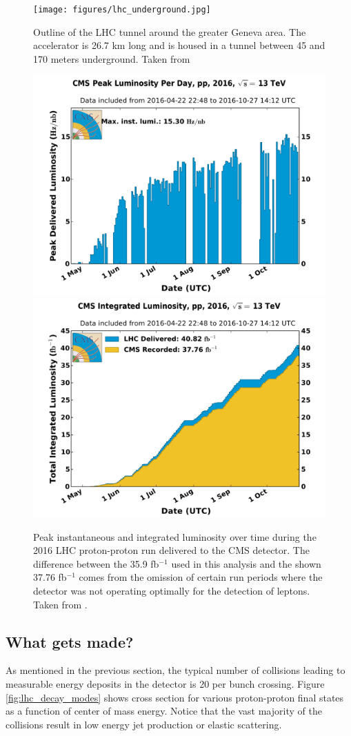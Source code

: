   \begin{figure}[h!]
    \centering
    \texttt{[image: figures/lhc\_underground.jpg]}
    \caption{Outline of the LHC tunnel around the greater Geneva area. The accelerator is 26.7 km long and is housed in a tunnel between 45 and 170 meters underground. Taken from \cite{LHC_underground}}
    \label{fig:lhc_tunnel}
  \end{figure}

  \begin{figure}[h!]
    \centering
    \includegraphics[width=.48\textwidth]{figures/peak_lumi_per_day_pp_2016.pdf}
    \includegraphics[width=.48\textwidth]{figures/int_lumi_per_day_cumulative_pp_2016.pdf}
    \caption{Peak instantaneous and integrated luminosity over time during the 2016 LHC proton-proton run delivered to the CMS detector. The difference between the 35.9 fb$^{-1}$ used in this analysis and the shown 37.76 fb$^{-1}$ comes from the omission of certain run periods where the detector was not operating optimally for the detection of leptons. Taken from \cite{lumi_twiki}.}
    \label{fig:lumi_stats}
  \end{figure}

  \subsection{What gets made?} \label{sec:what_gets_made}
    As mentioned in the previous section, the typical number of collisions leading to measurable energy deposits in the detector is 20 per bunch crossing. Figure \ref{fig:lhc_decay_modes} shows cross section for various proton-proton final states as a function of center of mass energy. Notice that the vast majority of the collisions result in low energy jet production or elastic scattering. 

